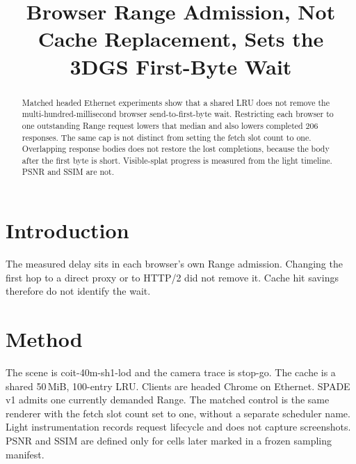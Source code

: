\documentclass[sigconf,anonymous,review]{acmart}
\begin{document}
\title{Browser Range Admission, Not Cache Replacement, Sets the 3DGS First-Byte Wait}
\begin{abstract}
Matched headed Ethernet experiments show that a shared LRU does not remove the multi-hundred-millisecond browser send-to-first-byte wait. Restricting each browser to one outstanding Range request lowers that median and also lowers completed 206 responses. The same cap is not distinct from setting the fetch slot count to one. Overlapping response bodies does not restore the lost completions, because the body after the first byte is short. Visible-splat progress is measured from the light timeline. PSNR and SSIM are not.
\end{abstract}
\maketitle
\section{Introduction}
The measured delay sits in each browser's own Range admission. Changing the first hop to a direct proxy or to HTTP/2 did not remove it. Cache hit savings therefore do not identify the wait.
\section{Method}
The scene is coit-40m-sh1-lod and the camera trace is stop-go. The cache is a shared 50\,MiB, 100-entry LRU. Clients are headed Chrome on Ethernet. SPADE v1 admits one currently demanded Range. The matched control is the same renderer with the fetch slot count set to one, without a separate scheduler name. Light instrumentation records request lifecycle and does not capture screenshots. PSNR and SSIM are defined only for cells later marked in a frozen sampling manifest.
\end{document}
